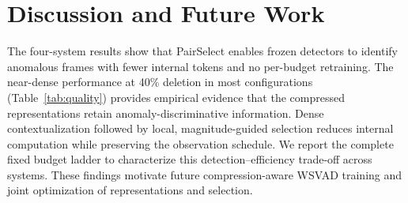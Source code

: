 \section{Discussion and Future Work}
\label{sec:limitations}
The four-system results show that PairSelect enables frozen detectors to identify anomalous frames with fewer internal tokens and no per-budget retraining. The near-dense performance at 40\% deletion in most configurations (Table~\ref{tab:quality}) provides empirical evidence that the compressed representations retain anomaly-discriminative information. Dense contextualization followed by local, magnitude-guided selection reduces internal computation while preserving the observation schedule. We report the complete fixed budget ladder to characterize this detection--efficiency trade-off across systems. These findings motivate future compression-aware WSVAD training and joint optimization of representations and selection.
